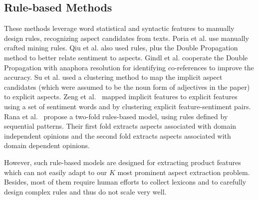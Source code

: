 \subsection{Rule-based Methods}
These methods leverage word statistical and 
syntactic features to manually design rules, recognizing aspect candidates 
from texts.
Poria et al. \cite{poria2014rule} use manually crafted mining rules. 
Qiu et al. \cite{DBLP:journals/coling/QiuLBC11} also used rules, plus the 
Double Propagation method to better relate sentiment to aspects. 
Gindl et al. \cite{gindl2013rule} cooperate the Double Propagation 
with anaphora resolution for identifying 
co-references to improve the accuracy. 
Su et al. \cite{su2008hidden} used a clustering method to map 
the implicit aspect candidates (which were assumed to be the noun form 
of adjectives in the paper) to explicit aspects. 
Zeng et al.~\cite{zeng2013classification} mapped implicit features 
to explicit features using a set of sentiment words and by clustering 
explicit feature-sentiment pairs.
Rana et al.~\cite{rana2017two} propose a two-fold rules-based model, 
using rules defined by sequential patterns. Their first fold extracts aspects 
associated with domain independent opinions and the 
second fold extracts aspects 
associated with domain dependent opinions. 

However, such rule-based models are designed for extracting product 
features which can not easily adapt to our $K$ most prominent 
aspect extraction problem. Besides, most of them require human efforts 
to collect lexicons and to carefully design complex rules and 
thus do not scale very well. 

